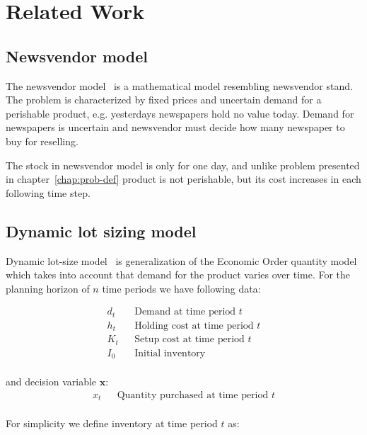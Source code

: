 
\chapter{Related Work}
\label{chap:Related Work}

\section{Newsvendor model}
\label{sec:Newsvendor model}

The newsvendor model~\autocite{Arrow1974} is a mathematical model resembling newsvendor stand. The problem is characterized by fixed prices and uncertain demand for a perishable product, e.g. yesterdays newspapers hold no value today. Demand for newspapers is uncertain and newsvendor must decide how many newspaper to buy for reselling.


The stock in newsvendor model is only for one day, and unlike problem presented in chapter~\ref{chap:prob-def} product is not perishable, but its cost increases in each following time step.

\section{Dynamic lot sizing model}
\label{sec:Dynamic lot sizing model}

Dynamic lot-size model~\autocite{Wagner2004} is generalization of the Economic Order quantity model~\autocite{Harris1990} which takes into account that demand for the product varies over time. For the planning horizon of $n$ time periods we have following data:

\begin{align*}
  d_t && \text{Demand at time period $t$} \\
  h_t && \text{Holding cost at time period $t$} \\
  K_t && \text{Setup cost at time period $t$} \\
  I_0 && \text{Initial inventory} \\
\end{align*}

and decision variable $\mathbf{x}$:
\begin{align*}
  x_t && \text{Quantity purchased at time period $t$}\\
\end{align*}

For simplicity we define inventory at time period $t$ as:

